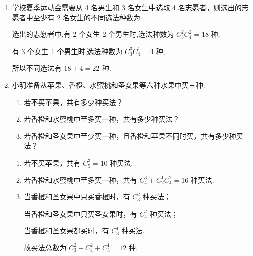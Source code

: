 \begin{enumerate}
\begin{enumerate}
\begin{jieda}
            若恰有 2 名女生参加，则有 ${{C}}_{5}^{2}{{C}}_{4}^{2} = {10} \times  6 = {60}$ 种，
            
            所以共有 ${40} + {60} = {100}$ 种不同的选派方式.
        \end{jieda}
        
        \item 学校夏季运动会需要从 4 名男生和 3 名女生中选取 4 名志愿者，则选出的志愿者中至少有 2 名女生的不同选法种数为
        \begin{jieda}
            选出的志愿者中,有 2 个女生 2 个男生时,选法种数为 ${{C}}_{3}^{2}{{C}}_{4}^{2} = {18}$ 种,
            
            有 3 个女生 1 个男生时,选法种数为 ${{C}}_{3}^{3}{{C}}_{4}^{1} = 4$ 种,
            
            所以不同选法有 ${18} + 4 = {22}$ 种.
        \end{jieda}
        \item 小明准备从苹果、香橙、水蜜桃和圣女果等六种水果中买三种.
        \begin{enumerate}
            \item 若不买苹果，共有多少种买法？
            \item 若香橙和水蜜桃中至多买一种，共有多少种买法？
            \item 若香橙和圣女果中至少买一种，且香橙和苹果不同时买，共有多少种买法？
        \end{enumerate}
        \begin{jieda}
            \begin{enumerate}
                \item 若不买苹果，共有 ${{C}}_{5}^{3} = {10}$ 种买法.
                
                \item 若香橙和水蜜桃中至多买一种，共有 ${{C}}_{4}^{3} + {{C}}_{2}^{1}{{C}}_{4}^{2} = {16}$ 种买法.
                
                \item 当香橙和圣女果中只买香橙时，有 ${{C}}_{3}^{2}$ 种买法；

                当香橙和圣女果中只买圣女果时，有 ${{C}}_{4}^{2}$ 种买法；
                
                当香橙和圣女果都买时，有 ${{C}}_{3}^{1}$ 种买法.
                
                故买法总数为 ${{C}}_{3}^{2} + {{C}}_{4}^{2} + {{C}}_{3}^{1} = {12}$ 种.
            \end{enumerate}
        \end{jieda}
        

\end{enumerate}
\end{enumerate}
